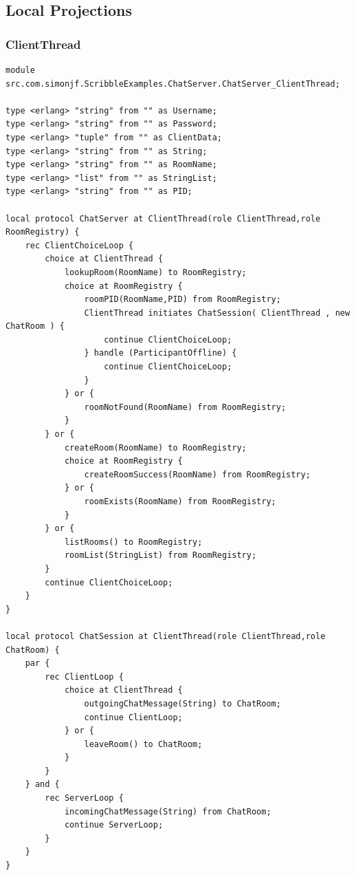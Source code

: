 \documentclass[a4paper]{article}
\begin{document}
\subsection{Local Projections}
\subsubsection{ClientThread}
\begin{lstlisting}[language=scribble]
module src.com.simonjf.ScribbleExamples.ChatServer.ChatServer_ClientThread;

type <erlang> "string" from "" as Username;
type <erlang> "string" from "" as Password;
type <erlang> "tuple" from "" as ClientData;
type <erlang> "string" from "" as String;
type <erlang> "string" from "" as RoomName;
type <erlang> "list" from "" as StringList;
type <erlang> "string" from "" as PID;

local protocol ChatServer at ClientThread(role ClientThread,role RoomRegistry) {
    rec ClientChoiceLoop {
        choice at ClientThread {
            lookupRoom(RoomName) to RoomRegistry;
            choice at RoomRegistry {
                roomPID(RoomName,PID) from RoomRegistry;
                ClientThread initiates ChatSession( ClientThread , new ChatRoom ) {
                    continue ClientChoiceLoop;
                } handle (ParticipantOffline) {
                    continue ClientChoiceLoop;
                }
            } or {
                roomNotFound(RoomName) from RoomRegistry;
            }
        } or {
            createRoom(RoomName) to RoomRegistry;
            choice at RoomRegistry {
                createRoomSuccess(RoomName) from RoomRegistry;
            } or {
                roomExists(RoomName) from RoomRegistry;
            }
        } or {
            listRooms() to RoomRegistry;
            roomList(StringList) from RoomRegistry;
        }
        continue ClientChoiceLoop;
    }
}

local protocol ChatSession at ClientThread(role ClientThread,role ChatRoom) {
    par {
        rec ClientLoop {
            choice at ClientThread {
                outgoingChatMessage(String) to ChatRoom;
                continue ClientLoop;
            } or {
                leaveRoom() to ChatRoom;
            }
        }
    } and {
        rec ServerLoop {
            incomingChatMessage(String) from ChatRoom;
            continue ServerLoop;
        }
    }
}
\end{lstlisting}
\end{document}
